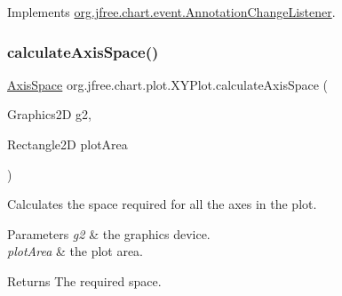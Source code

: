 Implements \mbox{\hyperlink{interfaceorg_1_1jfree_1_1chart_1_1event_1_1_annotation_change_listener_ac7367f136960e9a914a759b69595c535}{org.\+jfree.\+chart.\+event.\+Annotation\+Change\+Listener}}.

\mbox{\label{classorg_1_1jfree_1_1chart_1_1plot_1_1_x_y_plot_af5f4b2b0f930a8b438f40b812c2a130b}} 
\subsubsection{\texorpdfstring{calculate\+Axis\+Space()}{calculateAxisSpace()}}
{\footnotesize\ttfamily \mbox{\hyperlink{classorg_1_1jfree_1_1chart_1_1axis_1_1_axis_space}{Axis\+Space}} org.\+jfree.\+chart.\+plot.\+X\+Y\+Plot.\+calculate\+Axis\+Space (\begin{DoxyParamCaption}\item[{Graphics2D}]{g2,  }\item[{Rectangle2D}]{plot\+Area }\end{DoxyParamCaption})\hspace{0.3cm}{\ttfamily [protected]}}

Calculates the space required for all the axes in the plot.


\begin{DoxyParams}{Parameters}
{\em g2} & the graphics device. \\
\hline
{\em plot\+Area} & the plot area.\\
\hline
\end{DoxyParams}
\begin{DoxyReturn}{Returns}
The required space. 
\end{DoxyReturn}
\mbox{\label{classorg_1_1jfree_1_1chart_1_1plot_1_1_x_y_plot_ac74b657ad1a6cc1186b09f4d1657984e}} 
